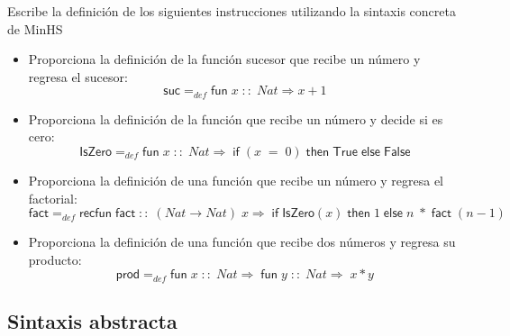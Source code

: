     \begin{exercise}
    Escribe la definición de los siguientes instrucciones utilizando la sintaxis concreta de \textsf{MinHS}\\

	\begin{itemize}
		\item Proporciona la definición de la función sucesor que recibe un número y regresa el sucesor: 
			$$ \textsf{suc} =_{def} \textsf{fun}\; x\;::\; \textit{Nat} \Rightarrow x + 1$$
		\item Proporciona la definición de la función que recibe un número y decide si es cero:
			 $$ \textsf{IsZero} =_{def} \textsf{fun}\; x\;::\; \textit{Nat} \Rightarrow\; \textsf{if}\; (x\; =\; 0) \; \textsf{then}\; \textsf{True}\; \textsf{else}\; \textsf{False}$$
		\item Proporciona la definición de una función que recibe un número y regresa el factorial:
			 $$ \textsf{fact} =_{def} \textsf{recfun}\; \textsf{fact}\; ::\; (\textit{Nat} \rightarrow \textit{Nat})\; x \Rightarrow\; \textsf{if}\; \textsf{IsZero}(x)\; \textsf{then}\; 1\; \textsf{else}\; n\; *\; \textsf{fact}\; (n-1)$$
		\item Proporciona la definición de una función que recibe dos números y regresa su producto:
			$$ \textsf{prod} =_{def} \textsf{fun}\; x\; ::\; Nat \Rightarrow\; \textsf{fun}\; y\; ::\; Nat \Rightarrow\; x*y$$
	\end{itemize}

    \end{exercise}

\subsection{Sintaxis abstracta}

